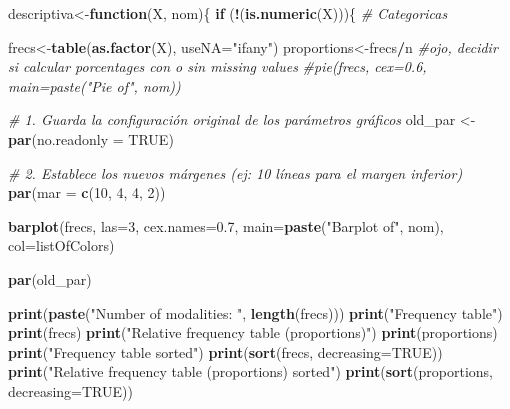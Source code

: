 \documentclass[
]{article}
\newenvironment{Shaded}{\begin{snugshade}}{\end{snugshade}}
\newcommand{\AttributeTok}[1]{\textcolor[rgb]{0.13,0.29,0.53}{#1}}
\newcommand{\CommentTok}[1]{\textcolor[rgb]{0.56,0.35,0.01}{\textit{#1}}}
\newcommand{\ConstantTok}[1]{\textcolor[rgb]{0.56,0.35,0.01}{#1}}
\newcommand{\ControlFlowTok}[1]{\textcolor[rgb]{0.13,0.29,0.53}{\textbf{#1}}}
\newcommand{\DecValTok}[1]{\textcolor[rgb]{0.00,0.00,0.81}{#1}}
\newcommand{\FloatTok}[1]{\textcolor[rgb]{0.00,0.00,0.81}{#1}}
\newcommand{\FunctionTok}[1]{\textcolor[rgb]{0.13,0.29,0.53}{\textbf{#1}}}
\newcommand{\NormalTok}[1]{#1}
\newcommand{\OtherTok}[1]{\textcolor[rgb]{0.56,0.35,0.01}{#1}}
\newcommand{\SpecialCharTok}[1]{\textcolor[rgb]{0.81,0.36,0.00}{\textbf{#1}}}
\newcommand{\StringTok}[1]{\textcolor[rgb]{0.31,0.60,0.02}{#1}}
\begin{document}
\begin{Shaded}
\begin{Highlighting}[]
\NormalTok{descriptiva}\OtherTok{\textless{}{-}}\ControlFlowTok{function}\NormalTok{(X, nom)\{}
  \ControlFlowTok{if}\NormalTok{ (}\SpecialCharTok{!}\NormalTok{(}\FunctionTok{is.numeric}\NormalTok{(X)))\{ }
    \CommentTok{\# Categoricas}
    
\NormalTok{    frecs}\OtherTok{\textless{}{-}}\FunctionTok{table}\NormalTok{(}\FunctionTok{as.factor}\NormalTok{(X), }\AttributeTok{useNA=}\StringTok{"ifany"}\NormalTok{)}
\NormalTok{    proportions}\OtherTok{\textless{}{-}}\NormalTok{frecs}\SpecialCharTok{/}\NormalTok{n}
    \CommentTok{\#ojo, decidir si calcular porcentages con o sin missing values}
    \CommentTok{\#pie(frecs, cex=0.6, main=paste("Pie of", nom))}
    
    \CommentTok{\# 1. Guarda la configuración original de los parámetros gráficos}
\NormalTok{    old\_par }\OtherTok{\textless{}{-}} \FunctionTok{par}\NormalTok{(}\AttributeTok{no.readonly =} \ConstantTok{TRUE}\NormalTok{) }
    
    \CommentTok{\# 2. Establece los nuevos márgenes (ej: 10 líneas para el margen inferior)}
    \FunctionTok{par}\NormalTok{(}\AttributeTok{mar =} \FunctionTok{c}\NormalTok{(}\DecValTok{10}\NormalTok{, }\DecValTok{4}\NormalTok{, }\DecValTok{4}\NormalTok{, }\DecValTok{2}\NormalTok{)) }

    
    \FunctionTok{barplot}\NormalTok{(frecs, }\AttributeTok{las=}\DecValTok{3}\NormalTok{, }\AttributeTok{cex.names=}\FloatTok{0.7}\NormalTok{, }\AttributeTok{main=}\FunctionTok{paste}\NormalTok{(}\StringTok{"Barplot of"}\NormalTok{, nom), }\AttributeTok{col=}\NormalTok{listOfColors)}
    
    
    \FunctionTok{par}\NormalTok{(old\_par)}
    
    \FunctionTok{print}\NormalTok{(}\FunctionTok{paste}\NormalTok{(}\StringTok{"Number of modalities: "}\NormalTok{, }\FunctionTok{length}\NormalTok{(frecs)))}
    \FunctionTok{print}\NormalTok{(}\StringTok{"Frequency table"}\NormalTok{)}
    \FunctionTok{print}\NormalTok{(frecs)}
    \FunctionTok{print}\NormalTok{(}\StringTok{"Relative frequency table (proportions)"}\NormalTok{)}
    \FunctionTok{print}\NormalTok{(proportions)}
    \FunctionTok{print}\NormalTok{(}\StringTok{"Frequency table sorted"}\NormalTok{)}
    \FunctionTok{print}\NormalTok{(}\FunctionTok{sort}\NormalTok{(frecs, }\AttributeTok{decreasing=}\ConstantTok{TRUE}\NormalTok{))}
    \FunctionTok{print}\NormalTok{(}\StringTok{"Relative frequency table (proportions) sorted"}\NormalTok{)}
    \FunctionTok{print}\NormalTok{(}\FunctionTok{sort}\NormalTok{(proportions, }\AttributeTok{decreasing=}\ConstantTok{TRUE}\NormalTok{))}
    

\end{Highlighting}
\end{Shaded}
\end{document}
